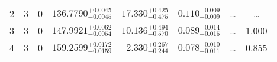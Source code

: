 \begin{table*}[!]
\begin{tabular}{llcrrlrc}
2 & 3 & 0 & $    136.7790_{-      0.0045}^{+      0.0045}$ & $      17.330_{-       0.475}^{+       0.425}$ & $       0.110_{-       0.009}^{+       0.009}$ & \multicolumn{1}{c}{\dots} & \dots \\[1pt]
3 & 3 & 0 & $    147.9921_{-      0.0054}^{+      0.0062}$ & $      10.136_{-       0.570}^{+       0.494}$ & $       0.089_{-       0.015}^{+       0.014}$ & \multicolumn{1}{c}{\dots} & 1.000 \\[1pt]
4  & 3 & 0 & $    159.2599_{-      0.0159}^{+      0.0172}$ & $       2.330_{-       0.244}^{+       0.267}$ & $       0.078_{-       0.011}^{+       0.010}$ & \multicolumn{1}{c}{\dots} & 0.855\\[1pt]
\hline
\end{tabular}
\end{table*}